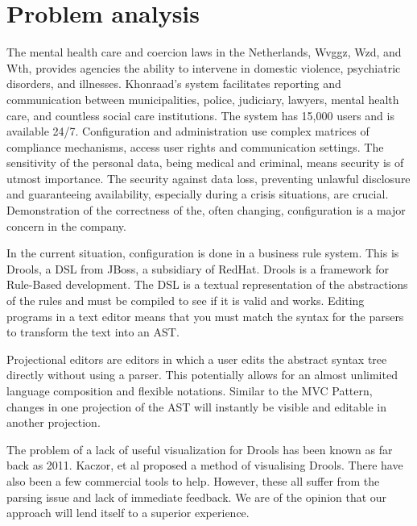 \section{Problem analysis}

The mental health care and coercion laws in the Netherlands, Wvggz, Wzd, and Wth, provides agencies the ability to intervene in domestic violence, psychiatric disorders, and illnesses.
Khonraad's system facilitates reporting and communication between municipalities, police, judiciary, lawyers, mental health care, and countless social care institutions.
The system has 15,000 users and is available 24/7. Configuration and administration use complex matrices of compliance mechanisms, access user rights and communication settings.
The sensitivity of the personal data, being medical and criminal, means security is of utmost importance.
The security against data loss, preventing unlawful disclosure and guaranteeing availability, especially during a crisis situations, are crucial.
Demonstration of the correctness of the, often changing, configuration is a major concern in the company. 

In the current situation, configuration is done in a business rule system. This is Drools, a DSL from JBoss, a subsidiary of RedHat.
Drools is a framework for Rule-Based development.
The DSL is a textual representation of the abstractions of the rules and must be compiled to see if it is valid and works.
Editing programs in a text editor means that you must match the syntax for the parsers to transform the text into an AST.

Projectional editors are editors in which a user edits the abstract syntax tree directly without using a parser\cite{voelter2014generic}.
This potentially allows for an almost unlimited language composition and flexible notations.
Similar to the MVC Pattern, changes in one projection of the AST will instantly be visible and editable in another projection\cite{guttormsen2017consistent}.

The problem of a lack of useful visualization for Drools has been known as far back as 2011.
Kaczor, et al\cite{kaczor2011visual} proposed a method of visualising Drools. 
There have also been a few commercial tools to help.
However, these all suffer from the parsing issue and lack of immediate feedback. 
We are of the opinion that our approach will lend itself to a superior experience.
